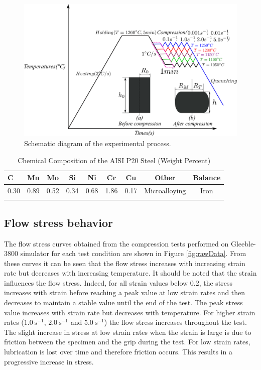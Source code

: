 \documentclass[twoside,english,1p,final,sort&compress]{elsarticle}
\theoremstyle{plain}
\begin{document}
\begin{figure}[!ht]
\centering
\includegraphics[width=0.9\columnwidth]
{Figures/GleebleDesign}
\caption{Schematic diagram of the experimental process.}
\label{fig:Heating}
\end{figure}
\begin{table}[h!]
\centering{}
\caption{Chemical Composition of the AISI P20 Steel (Weight Percent)}
\begin{tabular}{lcccccccc}
\hline
C  &Mn & Mo   & Si   & Ni       &Cr& Cu & Other& Balance\\
\hline
 0.30        &       0.89      &0.52		   &	0.34     &	 0.68          &1.86& 0.17& Microalloying& Iron\\
\hline
\label{tab:Composition}
\end{tabular}
\end{table}
\subsection{Flow stress behavior}
The flow stress curves obtained from the compression tests performed on Gleeble-3800 simulator for each test condition are shown in Figure \ref{fig:rawData}. From these curves it can be seen that the flow stress increases with increasing strain rate but decreases with increasing temperature. It should be noted that the strain influences the flow stress. Indeed, for all strain values below $0.2$, the stress increases with strain before reaching a peak value at low strain rates and then decreases to maintain a stable value until the end of the test. The peak stress value increases with strain rate but decreases with temperature. For higher strain rates ($1.0\ \text{s}^{-1}$, $2.0\ \text{s}^{-1}$ and $5.0\ \text{s}^{-1}$) the flow stress increases throughout the test. The slight increase in stress at low strain rates when the strain is large is due to friction between the specimen and the grip during the test. For low strain rates, lubrication is lost over time and therefore friction occurs. This results in a progressive increase in stress.
\end{document}
